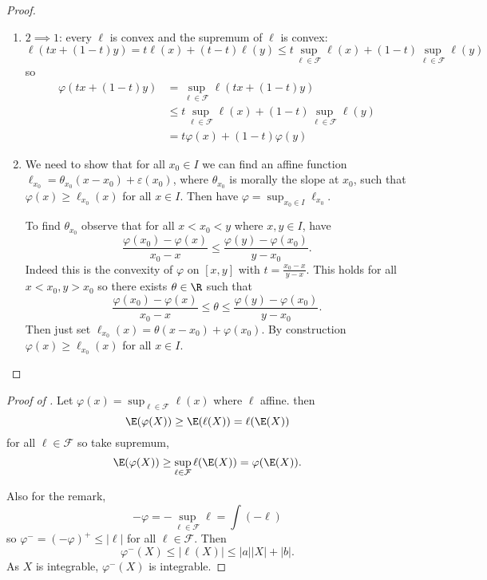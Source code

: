 \documentclass[a4paper]{article}
\begin{document}
\begin{proof}\leavevmode
  \begin{enumerate}
  \item \(2 \implies 1\): every \(\ell\) is convex and the supremum of \(\ell\) is convex:
    \[
      \ell(t x + (1 - t) y) = t \ell(x) + (t - t) \ell(y) \leq t \sup_{\ell \in \mathcal F} \ell(x) + (1 - t) \sup_{\ell \in \mathcal F} \ell(y)
    \]
    so
    \begin{align*}
      \varphi(tx + (1 - t)y)
      &= \sup_{\ell \in \mathcal F} \ell( t x + (1 - t) y) \\
      &\leq t \sup_{\ell \in \mathcal F} \ell(x) + (1 - t) \sup_{\ell \in \mathcal F} \ell(y) \\
      &= t \varphi(x) + (1 - t) \varphi(y)
    \end{align*}
  \item We need to show that for all \(x_0 \in I\) we can find an affine function \(\ell_{x_0} = \theta_{x_0} (x - x_0) + \varepsilon(x_0)\), where \(\theta_{x_0}\) is morally the slope at \(x_0\), such that \(\varphi(x) \geq \ell_{x_0}(x)\) for all \(x \in I\). Then have \(\varphi = \sup_{x_0 \in I} \ell_{x_0}\).

    To find \(\theta_{x_0}\) observe that for all \(x < x_0 < y\) where \(x, y \in I\), have
    \[
      \frac{\varphi(x_0) - \varphi(x)}{x_0 - x} \leq \frac{\varphi(y) - \varphi(x_0)}{y - x_0}.
    \]
    Indeed this is the convexity of \(\varphi\) on \([x, y]\) with \(t = \frac{x_0 - x}{y - x}\). This holds for all \(x < x_0, y > x_0\) so there exists \(\theta \in \R\) such that
    \[
      \frac{\varphi(x_0) - \varphi(x)}{x_0 - x} \leq \theta \leq \frac{\varphi(y) - \varphi(x_0)}{y - x_0}.
    \]
    Then just set \(\ell_{x_0}(x) = \theta(x - x_0) + \varphi(x_0)\). By construction \(\varphi(x) \geq \ell_{x_0}(x)\) for all \(x \in I\).
  \end{enumerate}
\end{proof}

\begin{proof}[Proof of ]
  Let \(\varphi(x) = \sup_{\ell \in \mathcal F} \ell(x)\) where \(\ell\) affine. then
    \[
      \E(\varphi(X)) \geq \E(\ell(X)) = \ell(\E(X))
    \]
    for all \(\ell \in \mathcal F\) so take supremum,
    \[
      \E(\varphi(X)) \geq \sup_{\ell \in \mathcal F} \ell(\E(X)) = \varphi(\E(X)).
    \]

    Also for the remark,
    \[
      - \varphi = - \sup_{\ell \in \mathcal F} \ell = \int(-\ell)
    \]
    so \(\varphi^- = (-\varphi)^+ \leq |\ell|\) for all \(\ell \in \mathcal F\). Then
    \[
      \varphi^-(X) \leq |\ell(X)| \leq |a| |X| + |b|.
    \]
    As \(X\) is integrable, \(\varphi^-(X)\) is integrable.
\end{proof}
\end{document}

